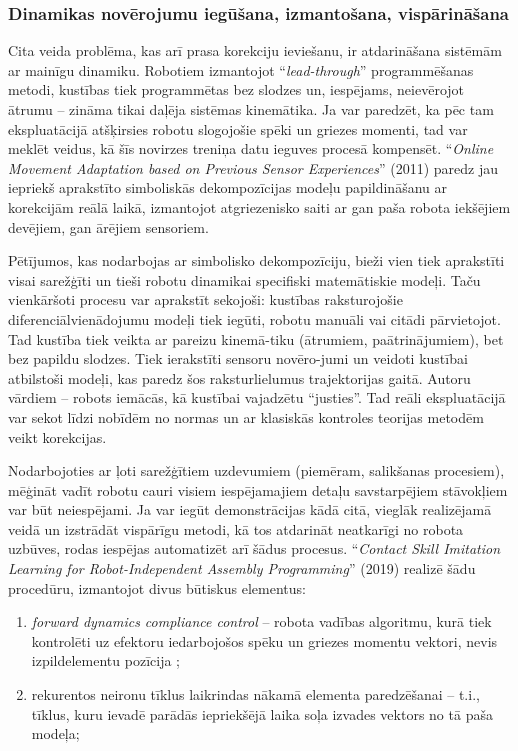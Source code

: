 \documentclass[12pt, a4paper]{article}
\numberwithin{equation}{section} %
\begin{document}
\subsubsection{Dinamikas novērojumu iegūšana, izmantošana, vispārināšana} 

Cita veida problēma, kas arī prasa korekciju ieviešanu, ir atdarināšana sistēmām ar mainīgu dinamiku. Robotiem izmantojot ``\textit{lead-through}'' programmēšanas metodi, kustības tiek programmētas bez slodzes un, iespējams, neievērojot ātrumu -- zināma tikai daļēja sistēmas kinemātika. Ja var paredzēt, ka pēc tam ekspluatācijā atšķirsies robotu slogojošie spēki un griezes momenti, tad var meklēt veidus, kā šīs novirzes treniņa datu ieguves procesā kompensēt. ``\textit{Online Movement Adaptation based on Previous Sensor Experiences}'' \cite{pastor2011online} (2011) paredz jau iepriekš aprakstīto simboliskās dekompozīcijas modeļu papildināšanu ar korekcijām reālā laikā, izmantojot atgriezenisko saiti ar gan paša robota iekšējiem devējiem, gan ārējiem sensoriem. 

Pētījumos, kas nodarbojas ar simbolisko dekompozīciju, bieži vien tiek aprakstīti visai sarežģīti un tieši robotu dinamikai specifiski matemātiskie modeļi. Taču vienkāršoti procesu var aprakstīt sekojoši: kustības raksturojošie diferenciālvienādojumu modeļi tiek iegūti, robotu manuāli vai citādi pārvietojot. Tad kustība tiek veikta ar pareizu kinemā-tiku (ātrumiem, paātrinājumiem), bet bez papildu slodzes. Tiek ierakstīti sensoru novēro-jumi un veidoti kustībai atbilstoši modeļi, kas paredz šos raksturlielumus trajektorijas gaitā. Autoru vārdiem -- robots iemācās, kā kustībai vajadzētu ``justies''. Tad reāli ekspluatācijā var sekot līdzi nobīdēm no normas un ar klasiskās kontroles teorijas metodēm veikt korekcijas.

Nodarbojoties ar ļoti sarežģītiem uzdevumiem (piemēram, salikšanas procesiem), mēģināt vadīt robotu cauri visiem iespējamajiem detaļu savstarpējiem stāvokļiem var būt neiespējami. Ja var iegūt demonstrācijas kādā citā, vieglāk realizējamā veidā un izstrādāt vispārīgu metodi, kā tos atdarināt neatkarīgi no robota uzbūves, rodas iespējas automatizēt arī šādus procesus. ``\textit{Contact Skill Imitation Learning for Robot-Independent Assembly Programming}'' \cite{scherzinger2019contact} (2019) realizē šādu procedūru, izmantojot divus būtiskus elementus:

\begin{enumerate}
    \item \textit{forward dynamics compliance control} -- robota vadības algoritmu, kurā tiek kontrolēti uz efektoru iedarbojošos spēku un griezes momentu vektori, nevis izpildelementu pozīcija \cite{scherzinger2017forward};
    \item rekurentos neironu tīklus laikrindas nākamā elementa paredzēšanai -- t.i., tīklus, kuru ievadē parādās iepriekšējā laika soļa izvades vektors no tā paša modeļa;
\end{enumerate}
\end{document}
